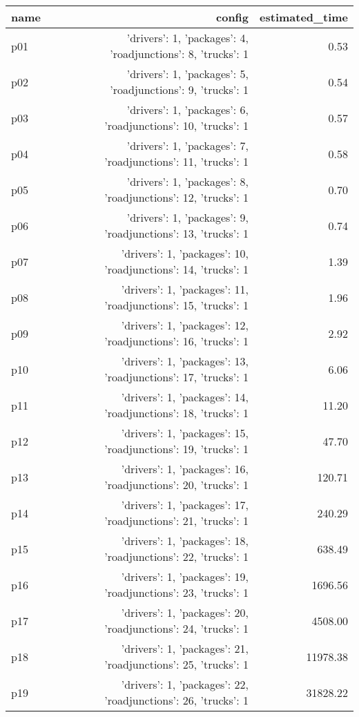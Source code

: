 \documentclass{article}
\begin{document}
                            \begin{center}
                            \scriptsize
                            \begin{tabular}{@{}l|r|r@{}}
                            name & config & estimated\_time\\\midrule
                              p01&{'drivers': 1, 'packages': 4, 'roadjunctions': 8, 'trucks': 1}&0.53\\
  p02&{'drivers': 1, 'packages': 5, 'roadjunctions': 9, 'trucks': 1}&0.54\\
  p03&{'drivers': 1, 'packages': 6, 'roadjunctions': 10, 'trucks': 1}&0.57\\
  p04&{'drivers': 1, 'packages': 7, 'roadjunctions': 11, 'trucks': 1}&0.58\\
  p05&{'drivers': 1, 'packages': 8, 'roadjunctions': 12, 'trucks': 1}&0.70\\
  p06&{'drivers': 1, 'packages': 9, 'roadjunctions': 13, 'trucks': 1}&0.74\\
  p07&{'drivers': 1, 'packages': 10, 'roadjunctions': 14, 'trucks': 1}&1.39\\
  p08&{'drivers': 1, 'packages': 11, 'roadjunctions': 15, 'trucks': 1}&1.96\\
  p09&{'drivers': 1, 'packages': 12, 'roadjunctions': 16, 'trucks': 1}&2.92\\
  p10&{'drivers': 1, 'packages': 13, 'roadjunctions': 17, 'trucks': 1}&6.06\\
  p11&{'drivers': 1, 'packages': 14, 'roadjunctions': 18, 'trucks': 1}&11.20\\
  p12&{'drivers': 1, 'packages': 15, 'roadjunctions': 19, 'trucks': 1}&47.70\\
  p13&{'drivers': 1, 'packages': 16, 'roadjunctions': 20, 'trucks': 1}&120.71\\
  p14&{'drivers': 1, 'packages': 17, 'roadjunctions': 21, 'trucks': 1}&240.29\\
  p15&{'drivers': 1, 'packages': 18, 'roadjunctions': 22, 'trucks': 1}&638.49\\
  p16&{'drivers': 1, 'packages': 19, 'roadjunctions': 23, 'trucks': 1}&1696.56\\
  p17&{'drivers': 1, 'packages': 20, 'roadjunctions': 24, 'trucks': 1}&4508.00\\
  p18&{'drivers': 1, 'packages': 21, 'roadjunctions': 25, 'trucks': 1}&11978.38\\
  p19&{'drivers': 1, 'packages': 22, 'roadjunctions': 26, 'trucks': 1}&31828.22\\

\end{tabular}
\end{center}
\end{document}
